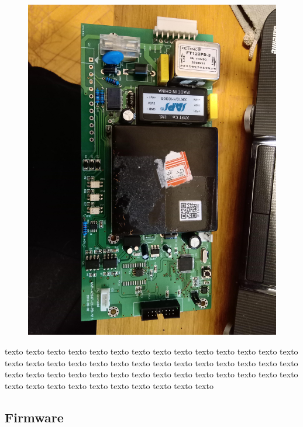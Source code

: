 \documentclass[
11pt, %
]{charter}
\begin{document}
\begin{figure}[htpb]
\centering 
\includegraphics[width=1\textwidth]{./Pics/IMG_20210523_190031.jpg}
\caption{}
\label{fig:Placa de control de repuesto.}
\end{figure}


texto texto texto texto texto texto texto texto texto texto texto texto texto texto texto texto texto texto texto texto texto texto texto texto texto texto texto texto texto texto texto texto texto texto texto texto texto texto texto texto texto texto texto texto texto texto texto texto texto texto texto texto 
\pagebreak


	

\pagebreak
\subsection{Firmware}
\end{document}
